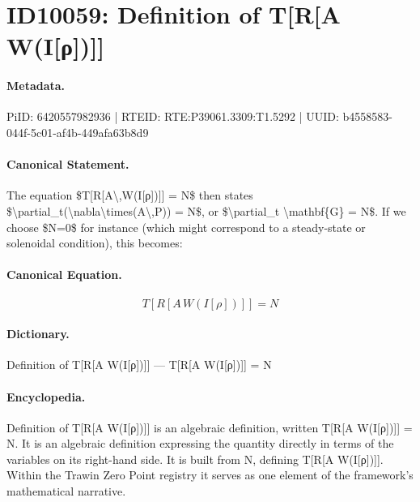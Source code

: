 \section*{ID10059: Definition of T[R[A W(I[ρ])]]}
\paragraph{Metadata.}
PiID: 6420557982936 | RTEID: RTE:P39061.3309:T1.5292 | UUID: b4558583-044f-5c01-af4b-449afa63b8d9

\paragraph{Canonical Statement.}
The equation \$T[R[A\textbackslash{},W(I[ρ])]] = N\$ then states \$\textbackslash{}partial\_t(\textbackslash{}nabla\textbackslash{}times(A\textbackslash{},P)) = N\$, or \$\textbackslash{}partial\_t \textbackslash{}mathbf\{G\} = N\$. If we choose \$N=0\$ for instance (which might correspond to a steady-state or solenoidal condition), this becomes:

\paragraph{Canonical Equation.}
\[
T[R[A\,W(I[ρ])]] = N
\]

\paragraph{Dictionary.}
Definition of T[R[A W(I[ρ])]] — T[R[A W(I[ρ])]] = N

\paragraph{Encyclopedia.}
Definition of T[R[A W(I[ρ])]] is an algebraic definition, written T[R[A W(I[ρ])]] = N. It is an algebraic definition expressing the quantity directly in terms of the variables on its right-hand side. It is built from N, defining T[R[A W(I[ρ])]]. Within the Trawin Zero Point registry it serves as one element of the framework's mathematical narrative.
